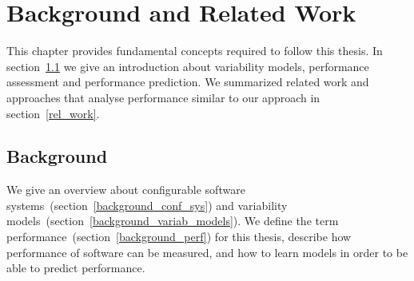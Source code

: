 \chapter{Background and Related Work}
\label{b_rel_work}

This chapter provides fundamental concepts required to follow this thesis. 
In section~\ref{background} we give an introduction about variability models, performance assessment and performance prediction. 
We summarized related work and approaches that analyse performance similar to our approach in section~\ref{rel_work}.

\section{Background}
\label{background}

We give an overview about configurable software systems~(section~\ref{background_conf_sys}) and variability models~(section~\ref{background_variab_models}). 
We define the term performance~(section~\ref{background_perf}) for this thesis, describe how performance of software can be measured, and how to learn models in order to be able to predict performance.

